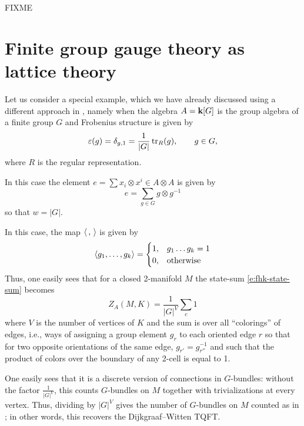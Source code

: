 FIXME


\section{Finite group gauge theory as lattice theory}\label{s:lattice-gauge}
Let us consider a special example, which we have already discussed using a
different approach in , namely when the algebra $A=\mathbf{k}[G]$
is the group algebra of a finite group $G$ and Frobenius structure is given by
$$
  \varepsilon(g)=\delta_{g,1} = \frac{1}{|G|}\operatorname{tr}_R(g), \qquad g\in G,
$$
where $R$ is the regular representation.

In this case the element $e=\sum x_i\otimes x^i\in A\otimes A$ is given by
$$
  e=\sum_{g\in G}g\otimes g^{-1}
$$
so that $w=|G|$.

In this case, the map $\langle\, , \,\rangle$ is given by
$$
  \langle g_1, \dots, g_k\rangle=\begin{cases}
                 1, & g_1\dots g_k=1\\
               0, & \text{otherwise}
                   \end{cases}
$$
Thus, one easily sees that for a closed 2-manifold $M$
the state-sum \eqref{e:fhk-state-sum} becomes
$$
  Z_A(M,K)=\frac{1}{|G|^V} \sum_{c} 1
$$
where $V$ is the number of vertices of $K$ and  the sum is over all
``colorings'' of edges, i.e., ways of assigning a group element $g_r$ to each
oriented edge $r$ so that for two opposite orientations of the same edge,
$g_{r'}=g_{r''}^{-1}$ and such that the product of colors over the boundary of
any 2-cell is equal to 1.

One easily sees that it is a discrete version of connections in $G$-bundles:
without the factor $\frac{1}{|G|^V}$, this counts $G$-bundles on $M$ together
with trivializations at every vertex. Thus, dividing by $|G|^V$ gives
the number of $G$-bundles on $M$ counted as in ; in other words,
this recovers the Dijkgraaf--Witten TQFT.

